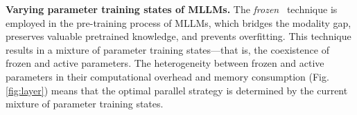 \documentclass[conference]{IEEEtran}
\begin{document}


\textbf{Varying parameter training states of MLLMs.}
The \textit{frozen}~\cite {tsimpoukelli2021multimodal} technique is employed in the pre-training process of MLLMs, which bridges the modality gap, preserves valuable pretrained knowledge, and prevents overfitting.
This technique results in a mixture of parameter training states—that is, the coexistence of frozen and active parameters.
The heterogeneity between frozen and active parameters in their computational overhead and memory consumption (Fig. \ref{fig:layer}) means that the optimal parallel strategy is determined by the current mixture of parameter training states.
\end{document}
